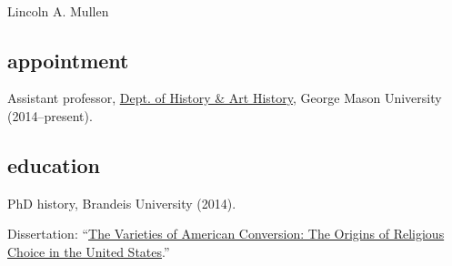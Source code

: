 \documentclass[11pt]{article}
\begin{document}
\thispagestyle{fancy}
\fancyfoot{}
\fancyhead{}
\renewcommand{\headrulewidth}{0pt}

\hfill\hfill\hfill
\hfill\hfill\hfill
\hfill\hfill\hfill
\hfill\hfill\hfill
\begin{minipage}[t]{1.4in}
   \\
\end{minipage}
\hfill
\begin{minipage}[t]{1.9in}
\end{minipage}

\vspace{0.1in}

{\Large Lincoln A. Mullen}\\[-0.1in]

\subsection{appointment}\label{appointment}

Assistant professor, \href{http://historyarthistory.gmu.edu/}{Dept.
  of History \& Art History}, George Mason University (2014--present).

\subsection{education}\label{education}

PhD history, Brandeis University (2014). 

\hfill\begin{minipage}{6.25in}

  Dissertation: ``\href{/research/\#dissertation}{The Varieties of American 
    Conversion: The Origins of Religious Choice in the United States}.'' 

\end{minipage}

\vspace{0.05in}
\end{document}
